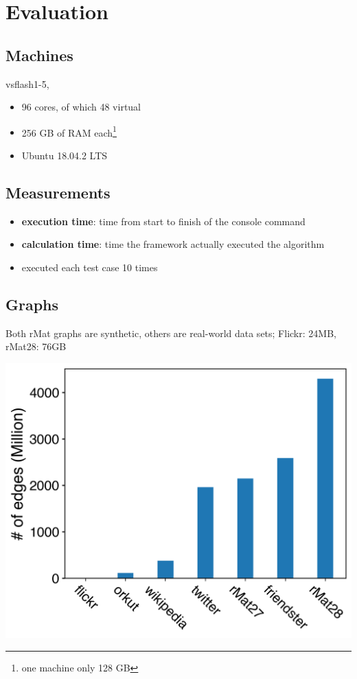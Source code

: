 \documentclass{meetings}
\begin{document}
\restoregeometry


\section{Evaluation}
\begin{multicols}{2}
\subsection*{Machines}
vsflash1-5,
\begin{itemize}
	\item 96 cores, of which 48 virtual
	\item 256 GB of RAM each\footnote{\sffamily one machine only 128 GB}
	\item Ubuntu 18.04.2 LTS
\end{itemize}
\subsection*{Measurements}
\begin{itemize}
	\item \textbf{execution time}: time from start to finish of the console command
	\item \textbf{calculation time}: time the framework actually executed the algorithm
	\item executed each test case 10 times
\end{itemize}

\columnbreak

\subsection*{Graphs}
Both rMat graphs are synthetic, others are real-world data sets; Flickr: 24MB, rMat28: 76GB%
\begin{center}
	\includegraphics[width=\linewidth]{graphsize.png}
\end{center}
\end{multicols}
\end{document}
